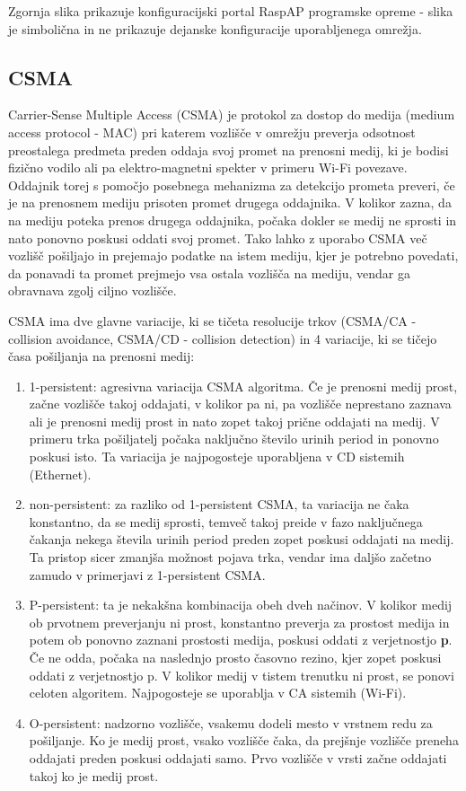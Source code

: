\documentclass[11pt,a4paper,slovene]{article}
\begin{document}
Zgornja slika prikazuje konfiguracijski portal RaspAP programske opreme - slika je simbolična in ne prikazuje dejanske konfiguracije uporabljenega omrežja.\\

\subsection{CSMA}
Carrier-Sense Multiple Access (CSMA) je protokol za dostop do medija (medium access protocol - MAC) pri katerem vozlišče v omrežju preverja odsotnost preostalega predmeta preden oddaja svoj promet na prenosni medij, ki je bodisi fizično vodilo ali pa elektro-magnetni spekter v primeru Wi-Fi povezave.\\
Oddajnik torej s pomočjo posebnega mehanizma za detekcijo prometa preveri, če je na prenosnem mediju prisoten promet drugega oddajnika. V kolikor zazna, da na mediju poteka prenos drugega oddajnika, počaka dokler se medij ne sprosti in nato ponovno poskusi oddati svoj promet. Tako lahko z uporabo CSMA več vozlišč pošiljajo in prejemajo podatke na istem mediju, kjer je potrebno povedati, da ponavadi ta promet prejmejo vsa ostala vozlišča na mediju, vendar ga obravnava zgolj ciljno vozlišče.\cite{enwiki:1121314888}

CSMA ima dve glavne variacije, ki se tičeta resolucije trkov (CSMA/CA - collision avoidance, CSMA/CD - collision detection) in 4 variacije, ki se tičejo časa pošiljanja na prenosni medij:
\begin{enumerate}
\item 1-persistent: agresivna variacija CSMA algoritma. Če je prenosni medij prost, začne vozlišče takoj oddajati, v kolikor pa ni, pa vozlišče neprestano zaznava ali je prenosni medij prost in nato zopet takoj prične oddajati na medij. V primeru trka pošiljatelj počaka naključno število urinih period in ponovno poskusi isto. Ta variacija je najpogosteje uporabljena v CD sistemih (Ethernet).
\item non-persistent: za razliko od 1-persistent CSMA, ta variacija ne čaka konstantno, da se medij sprosti, temveč takoj preide v fazo naključnega čakanja nekega števila urinih period preden zopet poskusi oddajati na medij. Ta pristop sicer zmanjša možnost pojava trka, vendar ima daljšo začetno zamudo v primerjavi z 1-persistent CSMA.
\item P-persistent: ta je nekakšna kombinacija obeh dveh načinov. V kolikor medij ob prvotnem preverjanju ni prost, konstantno preverja za prostost medija in potem ob ponovno zaznani prostosti medija, poskusi oddati z verjetnostjo \textbf{p}. Če ne odda, počaka na naslednjo prosto časovno rezino, kjer zopet poskusi oddati z verjetnostjo p. V kolikor medij v tistem trenutku ni prost, se ponovi celoten algoritem. Najpogosteje se uporablja v CA sistemih (Wi-Fi).
\item O-persistent: nadzorno vozlišče, vsakemu dodeli mesto v vrstnem redu za pošiljanje. Ko je medij prost, vsako vozlišče čaka, da prejšnje vozlišče preneha oddajati preden poskusi oddajati samo. Prvo vozlišče v vrsti začne oddajati takoj ko je medij prost.
\end{enumerate}
\end{document}
